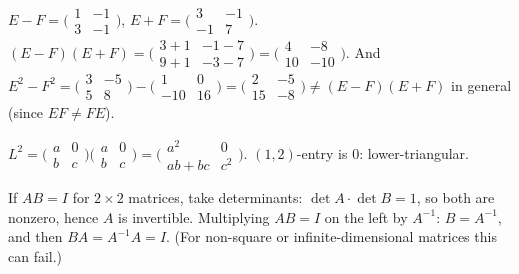 \begin{solutions}
    \item $E - F = \bigl(\begin{smallmatrix} 1 & -1 \\ 3 & -1 \end{smallmatrix}\bigr)$, $E + F = \bigl(\begin{smallmatrix} 3 & -1 \\ -1 & 7 \end{smallmatrix}\bigr)$. $(E - F)(E + F) = \bigl(\begin{smallmatrix} 3 + 1 & -1 - 7 \\ 9 + 1 & -3 - 7 \end{smallmatrix}\bigr) = \bigl(\begin{smallmatrix} 4 & -8 \\ 10 & -10 \end{smallmatrix}\bigr)$. And $E^{2} - F^{2} = \bigl(\begin{smallmatrix} 3 & -5 \\ 5 & 8 \end{smallmatrix}\bigr) - \bigl(\begin{smallmatrix} 1 & 0 \\ -10 & 16 \end{smallmatrix}\bigr) = \bigl(\begin{smallmatrix} 2 & -5 \\ 15 & -8 \end{smallmatrix}\bigr) \neq (E - F)(E + F)$ in general (since $E F \neq F E$).

    \item $L^{2} = \bigl(\begin{smallmatrix} a & 0 \\ b & c \end{smallmatrix}\bigr)\bigl(\begin{smallmatrix} a & 0 \\ b & c \end{smallmatrix}\bigr) = \bigl(\begin{smallmatrix} a^{2} & 0 \\ a b + b c & c^{2} \end{smallmatrix}\bigr)$. $(1,2)$-entry is $0$: lower-triangular.

    \item If $A B = I$ for $2 \times 2$ matrices, take determinants: $\det A \cdot \det B = 1$, so both are nonzero, hence $A$ is invertible. Multiplying $A B = I$ on the left by $A^{-1}$: $B = A^{-1}$, and then $B A = A^{-1} A = I$. (For non-square or infinite-dimensional matrices this can fail.)


\end{solutions}
